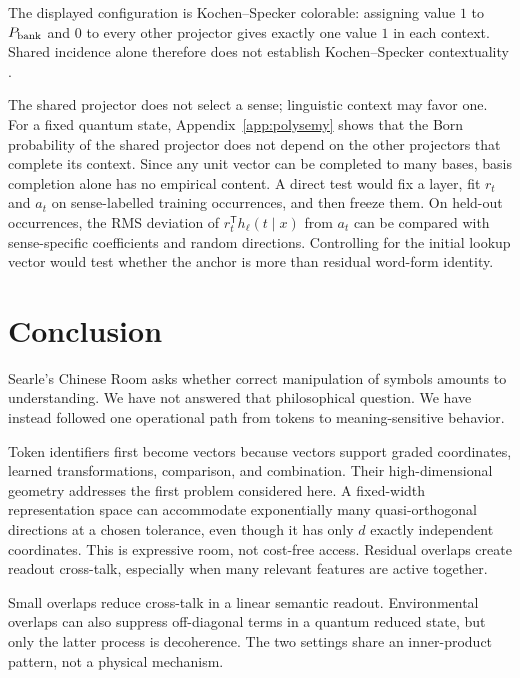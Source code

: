 \documentclass[
  aps,
  reprint,
  superscriptaddress,
  floatfix,
  nofootinbib,
  longbibliography
]{revtex4-2}
\newcommand{\T}{^{\mathsf T}}
\begin{document}
The displayed configuration is Kochen--Specker colorable: assigning value
$1$ to $P_{\rm bank}$ and $0$ to every other projector gives exactly one value
$1$ in each context.  Shared incidence alone therefore does not establish
Kochen--Specker contextuality \cite{specker-60,kochen1}.

The shared projector does not select a sense; linguistic context may favor
one.  For a fixed quantum state, Appendix~\ref{app:polysemy} shows that the
Born probability of the shared projector does not depend on the other
projectors that complete its context.  Since any unit vector can be completed
to many bases, basis completion alone has no empirical content.  A direct test
would fix a layer, fit $r_t$ and $a_t$ on sense-labelled training occurrences,
and then freeze them.  On held-out occurrences, the RMS deviation of
$r_t\T h_\ell(t\mid x)$ from $a_t$ can be compared with sense-specific
coefficients and random directions.  Controlling for the initial lookup vector
would test whether the anchor is more than residual word-form identity.
\section{Conclusion}
\label{sec:conclusion}

Searle's Chinese Room asks whether correct manipulation of symbols amounts to
understanding.  We have not answered that philosophical question.  We have
instead followed one operational path from tokens to meaning-sensitive
behavior.

Token identifiers first become vectors because vectors support graded
coordinates, learned transformations, comparison, and combination.  Their
high-dimensional geometry addresses the first problem considered here.  A
fixed-width representation space can accommodate exponentially many
quasi-orthogonal
directions at a chosen tolerance, even though it has only $d$ exactly
independent coordinates.  This is expressive room, not cost-free access.
Residual overlaps create readout cross-talk, especially when many relevant
features are active together.

Small overlaps reduce cross-talk in a linear semantic readout.  Environmental
overlaps can also suppress off-diagonal terms in a quantum reduced state, but
only the latter process is decoherence.  The two settings share an
inner-product pattern, not a physical mechanism.
\end{document}
